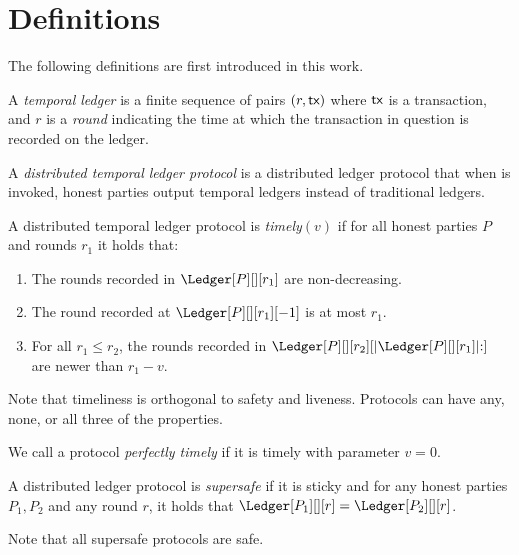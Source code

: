\section{Definitions}

The following definitions are first introduced in this work.

\begin{definition}
  A \emph{temporal ledger} is a finite sequence of pairs $(r, \textsf{tx})$ where $\textsf{tx}$ is
  a transaction, and $r$ is a \emph{round} indicating the time at which
  the transaction in question is recorded on the ledger.
\end{definition}

\begin{definition}
  A \emph{distributed temporal ledger protocol} is a distributed ledger protocol
  that when \rread is invoked, honest parties output temporal ledgers instead of traditional ledgers.
\end{definition}

\begin{definition}[Timely]\label{def:timely}
  A distributed temporal ledger protocol is \emph{timely}$(v)$
  if for all honest parties $P$ and rounds $r_1$ it holds that:

  \begin{enumerate}
    \item The rounds recorded in $\Ledger[P][][r_1]$ are non-decreasing.\label{def:timely-increasing}
    \item The round recorded at $\Ledger[P][][r_1][-1]$ is at most $r_1$.\label{def:timely-past}
    \item For all $r_1 \leq r_2$, the rounds recorded in $\Ledger[P][][r_2][|\Ledger[P][][r_1]|{:}]$ are
          newer than $r_1 - v$.\label{def:timely-chunk}
  \end{enumerate}
\end{definition}

Note that timeliness is orthogonal to safety and liveness. Protocols can have any, none, or all three
of the properties.

\begin{definition}
  We call a protocol \emph{perfectly timely} if it is timely with parameter $v = 0$.
\end{definition}

\begin{definition}[Supersafety]
  A distributed ledger protocol is \emph{supersafe} if it is sticky and
  for any honest parties $P_1, P_2$ and any round $r$, it holds that
  $\Ledger[P_1][][r] = \Ledger[P_2][][r]$.
\end{definition}

Note that all supersafe protocols are safe.

